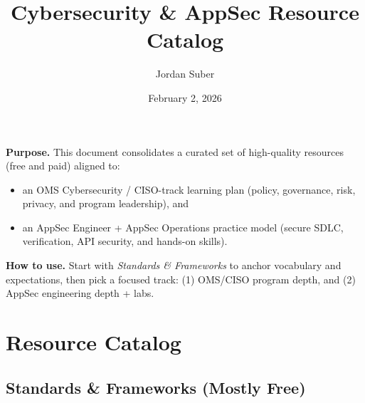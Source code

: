 \documentclass[11pt]{article}
\title{Cybersecurity \& AppSec Resource Catalog}
\author{Jordan Suber}
\date{February 2, 2026}
\begin{document}
\maketitle

\textbf{Purpose.} This document consolidates a curated set of high-quality resources (free and paid) aligned to:
\begin{itemize}[leftmargin=1.5em]
  \item an OMS Cybersecurity / CISO-track learning plan (policy, governance, risk, privacy, and program leadership), and
  \item an AppSec Engineer + AppSec Operations practice model (secure SDLC, verification, API security, and hands-on skills).
\end{itemize}

\textbf{How to use.} Start with \emph{Standards \& Frameworks} to anchor vocabulary and expectations, then pick a focused track:
(1) OMS/CISO program depth, and (2) AppSec engineering depth + labs.

\tableofcontents
\newpage

\section{Resource Catalog}

\small
\subsection{Standards \& Frameworks (Mostly Free)}
\end{document}
